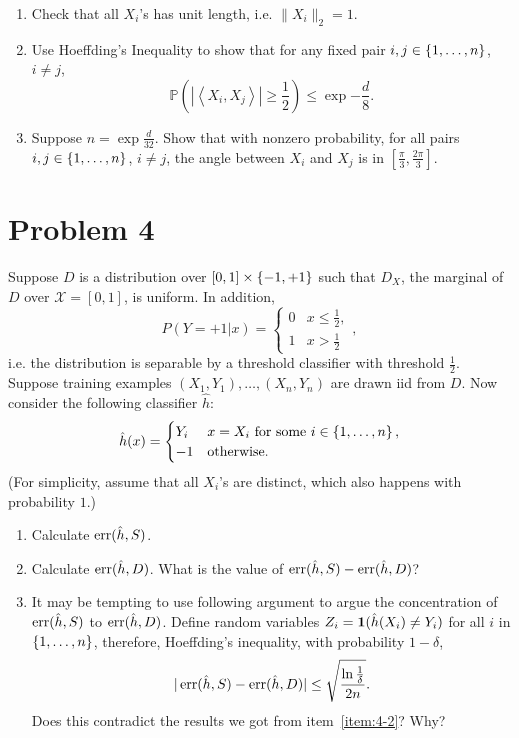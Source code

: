 \documentclass{article}
\DeclareMathOperator*{\err}{{\rm err}}
\newcommand{\PP}{\mathbb{P}} %
\newcommand{\Xcal}{\mathcal{X}} %
\newcommand*{\one}{{\bf 1}}
\newcommand{\inner}[2]{\left\langle #1,#2 \right\rangle}
\begin{document}
\begin{enumerate}
\item Check that all $X_i$'s has unit length, i.e. $\| X_i \|_2 = 1$.
\item Use Hoeffding's Inequality to show that for any fixed pair $i,j \in \cbr{1,\ldots,n}$, $i \neq j$,
\[ \PP(|\inner{X_i}{X_j}| \geq \frac{1}{2}) \leq \exp{-\frac{d}{8}}. \]
\item Suppose $n = \exp{\frac{d}{32}}$. Show that with nonzero probability,
for all pairs $i, j \in \cbr{1,\ldots,n}$, $i \neq j$,
the angle between $X_i$ and $X_j$ is in $[\frac{\pi}{3}, \frac{2\pi}{3}]$.
\end{enumerate}

\section*{Problem 4}
Suppose $D$ is a distribution over $[0,1] \times \cbr{-1,+1}$ such that $D_X$, the marginal
of $D$ over $\Xcal = [0,1]$, is uniform. In addition,
\[ P(Y=+1|x) = \begin{cases} 0 & x \leq \frac 1 2, \\ 1 & x > \frac 1 2 \end{cases}, \]
i.e. the distribution is separable by a threshold classifier with threshold $\frac 1 2$.
Suppose training examples $(X_1,Y_1), \ldots, (X_n, Y_n)$ are drawn iid from $D$.
Now consider the following classifier $\hat{h}$:
\[
\hat{h}(x) =
\begin{cases}
Y_i & x = X_i \text{ for some } i \in \cbr{1,\ldots,n}, \\
-1  & \text{otherwise.}
\end{cases}
\]
(For simplicity, assume that all $X_i$'s are distinct, which also happens with probability $1$.)

\begin{enumerate}
\item Calculate $\err(\hat{h}, S)$.
\item Calculate $\err(\hat{h}, D)$. What is the value of $\err(\hat{h}, S) - \err(\hat{h}, D)$?
\label{item:4-2}
\item It may be tempting to use following argument to argue the concentration of
$\err(\hat{h}, S)$ to $\err(\hat{h}, D)$. Define random variables
$Z_i = \one(\hat{h}(X_i) \neq Y_i)$ for all $i$ in $\cbr{1,\ldots,n}$, therefore, Hoeffding's inequality, with probability $1-\delta$,
\[ |\err(\hat{h}, S) - \err(\hat{h}, D)| \leq \sqrt{\frac{\ln\frac{1}{\delta}}{2n}}. \]
Does this contradict the results we got from item~\ref{item:4-2}? Why?
\end{enumerate}
\end{document}

